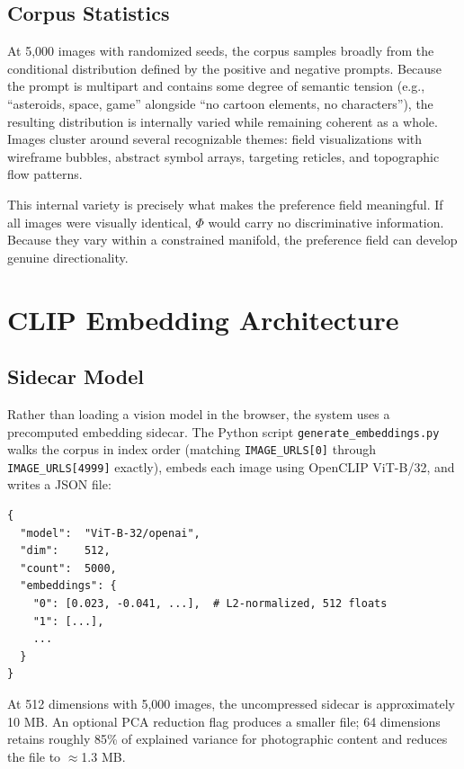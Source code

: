 \documentclass[12pt, a4paper]{article}
\begin{document}
\subsection{Corpus Statistics}

At 5,000 images with randomized seeds, the corpus samples broadly from the conditional distribution defined by the positive and negative prompts. Because the prompt is multipart and contains some degree of semantic tension (e.g., ``asteroids, space, game'' alongside ``no cartoon elements, no characters''), the resulting distribution is internally varied while remaining coherent as a whole. Images cluster around several recognizable themes: field visualizations with wireframe bubbles, abstract symbol arrays, targeting reticles, and topographic flow patterns.

This internal variety is precisely what makes the preference field meaningful. If all images were visually identical, $\Phi$ would carry no discriminative information. Because they vary within a constrained manifold, the preference field can develop genuine directionality.

\section{CLIP Embedding Architecture}

\subsection{Sidecar Model}

Rather than loading a vision model in the browser, the system uses a precomputed embedding sidecar. The Python script \texttt{generate\_embeddings.py} walks the corpus in index order (matching \texttt{IMAGE\_URLS[0]} through \texttt{IMAGE\_URLS[4999]} exactly), embeds each image using OpenCLIP ViT-B/32, and writes a JSON file:

\begin{lstlisting}[language={}, caption={Sidecar JSON structure}]
{
  "model":  "ViT-B-32/openai",
  "dim":    512,
  "count":  5000,
  "embeddings": {
    "0": [0.023, -0.041, ...],  # L2-normalized, 512 floats
    "1": [...],
    ...
  }
}
\end{lstlisting}

At 512 dimensions with 5,000 images, the uncompressed sidecar is approximately 10 MB. An optional PCA reduction flag produces a smaller file; 64 dimensions retains roughly 85\% of explained variance for photographic content and reduces the file to $\approx$1.3 MB.
\end{document}
